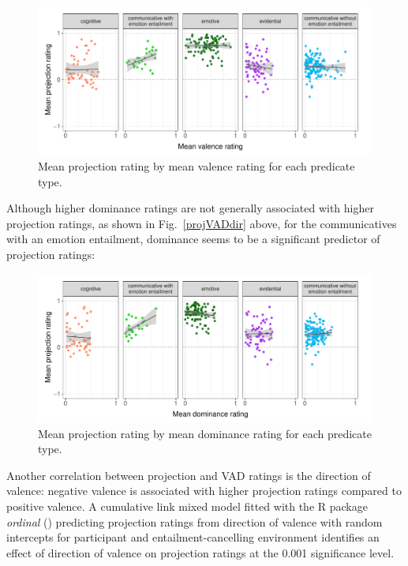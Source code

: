 \documentclass[11pt,fleqn]{article}
\newcommand{\figref}[1]{Fig.~\ref{#1}}
\newcommand{\6}{\mbox{$[\hspace*{-.6mm}[$}}
\newcommand{\9}{\mbox{$]\hspace*{-.6mm}]$}}
\begin{document}
\begin{figure}[H]
	\centering
	\includegraphics[width=1\textwidth]{projection-by-valence-faceted2}
	\caption{Mean projection rating by mean valence rating for each predicate type.}
	\label{projvalfac}
\end{figure}

Although higher dominance ratings are not generally associated with higher projection ratings, as shown in \figref{projVADdir} above, for the communicatives with an emotion entailment, dominance seems to be a significant predictor of projection ratings:
	
\begin{figure}[H]
	\centering
	\includegraphics[width=1\textwidth]{projection-by-dominance-faceted2}
	\caption{Mean projection rating by mean dominance rating for each predicate type.}
	\label{projdomfac}
\end{figure}

Another correlation between projection and VAD ratings is the direction of valence: negative valence is associated with higher projection ratings compared to positive valence. A cumulative link mixed model fitted with the R package \emph{ordinal} (\citealt{R-ordinal}) predicting projection ratings from direction of valence with random intercepts for participant and entailment-cancelling environment identifies an effect of direction of valence on projection ratings at the 0.001 significance level.
\end{document}
